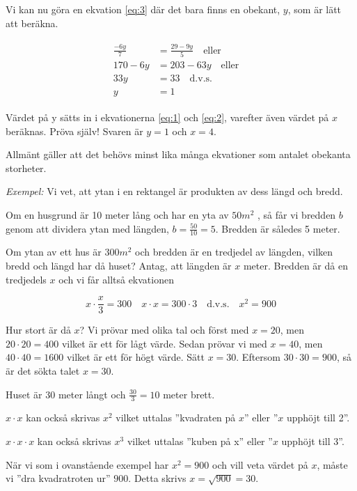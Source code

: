 Vi kan nu göra en ekvation \ref{eq:3} där det bara finns en obekant, \(y\),
som är lätt att beräkna.

\begin{align}
  \begin{split}
    \label{eq:3}
    \frac{ - 6y}{7} &= \frac{29 - 9y}{5}
    \quad \text{eller} \\
    170 - 6y &= 203-63y
    \quad \text{eller} \quad \\
    33y &= 33
    \quad \text{d.v.s.} \quad \\
    y &= 1
  \end{split}
\end{align}

Värdet på y sätts in i ekvationerna \ref{eq:1} och \ref{eq:2}, varefter även
värdet på \(x\) beräknas.
Pröva själv! Svaren är \(y = 1\) och \(x = 4\).

Allmänt gäller att det behövs minst lika många ekvationer som antalet obekanta
storheter.

\emph{Exempel:}
Vi vet, att ytan i en rektangel är produkten av dess längd och bredd.

Om en husgrund är 10 meter lång och har en yta av \(50 m^2\) , så får vi bredden
\(b\) genom att dividera ytan med längden, \(b = \frac{50}{10} = 5\).
Bredden är således 5 meter.

Om ytan av ett hus är \(300 m^2\) och bredden är en tredjedel av längden, vilken
bredd och längd har då huset?
Antag, att längden är \(x\) meter. Bredden är då en tredjedels \(x\) och vi får
alltså ekvationen

\[
x \cdot \frac{x}{3} = 300 \quad
x \cdot x = 300 \cdot 3 \quad \text{d.v.s.}
\quad x^2 = 900
\]

Hur stort är då \(x\)?
Vi prövar med olika tal och först med \(x = 20\), men \(20 \cdot 20 = 400\) vilket
är ett för lågt värde. Sedan prövar vi med \(x = 40\), men \(40 \cdot 40 = 1600\)
vilket är ett för högt värde. Sätt \(x = 30\). Eftersom \(30 \cdot 30 = 900\), så är
det sökta talet \(x = 30\).

Huset är 30 meter långt och \(\frac{30}{3} = 10\) meter brett.

\(x \cdot x\) kan också skrivas \(x^2\) vilket uttalas ''kvadraten på \(x\)'' eller
''\(x\) upphöjt till 2''.

\(x \cdot x \cdot x\) kan också skrivas \(x^3\) vilket uttalas ''kuben på x'' eller
''\(x\) upphöjt till 3''.

När vi som i ovanstående exempel har \(x^2 = 900\) och vill veta värdet på \(x\),
måste vi ''dra kvadratroten ur'' \(900\).
Detta skrivs \(x = \sqrt{900} = 30\).

